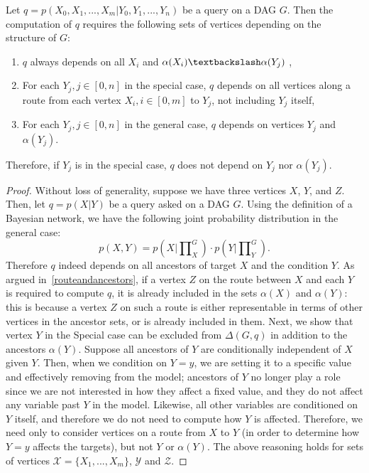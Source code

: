 \begin{theorem} \label{thm:querycost}
Let $q = p(X_{0}, X_{1}, ..., X_{m} | Y_{0}, Y_{1}, ..., Y_{n})$ be a query on a DAG $G$. Then the computation of $q$ requires the following sets of vertices depending on the structure of $G$:
\begin{enumerate}
\item $q$ always depends on all $X_{i}$ and $\alpha(X_{i})\textbackslash \alpha(Y_{j})$ , 
\item For each $Y_{j}, j\in[0,n]$ in the special case, $q$ depends on all vertices along a route from each vertex $X_{i}, i\in [0,m]$ to $Y_{j}$, not including $Y_{j}$ itself, 
\item For each $Y_{j}, j\in[0,n]$ in the general case, $q$ depends on vertices $Y_{j}$ and $\alpha(Y_{j})$.
\end{enumerate}

Therefore, if $Y_{j}$ is in the special case, $q$ does not depend on $Y_{j}$ nor $\alpha(Y_{j})$. 
\end{theorem}

\begin{proof}
Without loss of generality, suppose we have three vertices $X$, $Y$, and $Z$. Then, let $q = p(X|Y)$ be a query asked on a DAG $G$. Using the definition of a Bayesian network, we have the following joint probability distribution in the general case:
$$p(X, Y) =  p(X|\prod\nolimits_{X}^{G}) \cdot p(Y|\prod\nolimits_{Y}^{G}).$$ \newline
\null \quad \quad Therefore $q$ indeed depends on all ancestors of target $X$ and the condition $Y$. As argued in~\cref{routeandancestors}, if a vertex $Z$ on the route between $X$ and each $Y$ is required to compute $q$, it is already included in the sets $\alpha(X)$ and $\alpha(Y)$: this is because a vertex $Z$ on such a route is either representable in terms of other vertices in the ancestor sets, or is already included in them. \newline
\null \quad \quad Next, we show that vertex $Y$ in the Special case can be excluded from $\Delta(G,q)$ in addition to the ancestors $\alpha(Y)$. Suppose all ancestors of $Y$ are conditionally independent of $X$ given $Y$. Then, when we condition on $Y=y$, we are setting it to a specific value and effectively removing from the model; ancestors of $Y$ no longer play a role since we are not interested in how they affect a fixed value, and they do not affect any variable past $Y$ in the model.\newline 
\null \quad \quad Likewise, all other variables are conditioned on $Y$ itself, and therefore we do not need to compute how $Y$ is affected. Therefore, we need only to consider vertices on a route from $X$ to $Y$ (in order to determine how $Y=y$ affects the targets), but not $Y$ or $\alpha(Y)$. \newline
\null \quad \quad The above reasoning holds for sets of vertices $\mathcal{X} = \{X_{1}, ... , X_{m}\}$, $\mathcal{Y}$ and $\mathcal{Z}$.
\end{proof}

